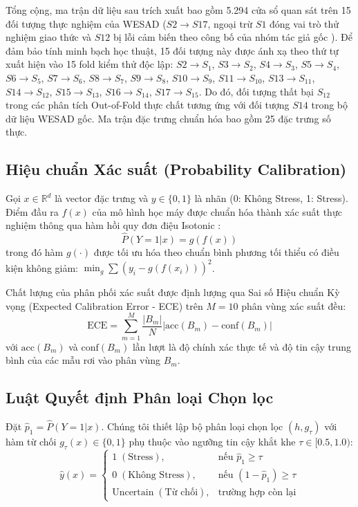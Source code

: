 \documentclass[conference]{IEEEtran}
\begin{document}
Tổng cộng, ma trận dữ liệu sau trích xuất bao gồm 5.294 cửa sổ quan sát trên 15 đối tượng thực nghiệm của WESAD ($S2 \rightarrow S17$, ngoại trừ $S1$ đóng vai trò thử nghiệm giao thức và $S12$ bị lỗi cảm biến theo công bố của nhóm tác giả gốc \cite{schmidt2018wesad}). Để đảm bảo tính minh bạch học thuật, 15 đối tượng này được ánh xạ theo thứ tự xuất hiện vào 15 fold kiểm thử độc lập: $S2 \rightarrow S_1$, $S3 \rightarrow S_2$, $S4 \rightarrow S_3$, $S5 \rightarrow S_4$, $S6 \rightarrow S_5$, $S7 \rightarrow S_6$, $S8 \rightarrow S_7$, $S9 \rightarrow S_8$, $S10 \rightarrow S_9$, $S11 \rightarrow S_{10}$, $S13 \rightarrow S_{11}$, $S14 \rightarrow S_{12}$, $S15 \rightarrow S_{13}$, $S16 \rightarrow S_{14}$, $S17 \rightarrow S_{15}$. Do đó, đối tượng thất bại $S_{12}$ trong các phân tích Out-of-Fold thực chất tương ứng với đối tượng $S14$ trong bộ dữ liệu WESAD gốc. Ma trận đặc trưng chuẩn hóa bao gồm 25 đặc trưng số thực.

\subsection{Hiệu chuẩn Xác suất (Probability Calibration)}
Gọi $x \in \mathbb{R}^d$ là vector đặc trưng và $y \in \{0, 1\}$ là nhãn (0: Không Stress, 1: Stress). Điểm đầu ra $f(x)$ của mô hình học máy được chuẩn hóa thành xác suất thực nghiệm thông qua hàm hồi quy đơn điệu Isotonic \cite{niculescu2005predicting}:
\begin{equation}
\hat{P}(Y=1|x) = g(f(x))
\end{equation}
trong đó hàm $g(\cdot)$ được tối ưu hóa theo chuẩn bình phương tối thiểu có điều kiện không giảm: $\min_g \sum (y_i - g(f(x_i)))^2$.

Chất lượng của phân phối xác suất được định lượng qua Sai số Hiệu chuẩn Kỳ vọng (Expected Calibration Error - ECE) \cite{guo2017calibration} trên $M=10$ phân vùng xác suất đều:
\begin{equation}
\text{ECE} = \sum_{m=1}^M \frac{|B_m|}{N} \left| \text{acc}(B_m) - \text{conf}(B_m) \right|
\end{equation}
với $\text{acc}(B_m)$ và $\text{conf}(B_m)$ lần lượt là độ chính xác thực tế và độ tin cậy trung bình của các mẫu rơi vào phân vùng $B_m$.

\subsection{Luật Quyết định Phân loại Chọn lọc}
Đặt $\hat{p}_1 = \hat{P}(Y=1|x)$. Chúng tôi thiết lập bộ phân loại chọn lọc $(h, g_\tau)$ với hàm từ chối $g_\tau(x) \in \{0, 1\}$ phụ thuộc vào ngưỡng tin cậy khắt khe $\tau \in [0.5, 1.0)$:
\begin{equation}
\hat{y}(x) = 
\begin{cases} 
1 \; (\text{Stress}), & \text{nếu } \hat{p}_1 \ge \tau \\
0 \; (\text{Không Stress}), & \text{nếu } (1 - \hat{p}_1) \ge \tau \\
\text{Uncertain} \; (\text{Từ chối}), & \text{trường hợp còn lại}
\end{cases}
\end{equation}
\end{document}
